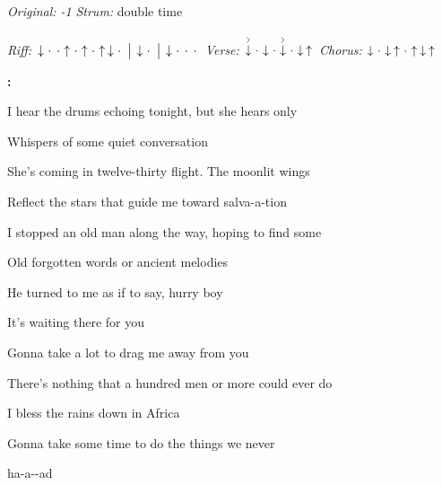 \begin{song}


\begin{headerbox}
 \quad
\textit{Original: -1} \quad
\textit{Strum:} double time \par
\textit{Riff:} $\Down\Miss\Miss\Up\Miss\Up\Miss\Up\Down\Miss \Separator \Down\Miss \Separator \Down\Miss\Miss\Miss$ \quad
\textit{Verse:} $\AccentDown\Miss\Down\Miss\AccentDown\Miss\Down\Up$ \quad
\textit{Chorus:} $\Down\Miss\Down\Up\Miss\Up\Down\Up$
\end{headerbox}

\begin{hchordbox}
\end{hchordbox}

\large

\bigskip

\Intro\textbf{:}     \par

\bigskip

 I hear the drums echoing tonight, but she hears only \par
{}Whispers of some quiet conversation  \par
{} She's coming in twelve-thirty flight. The moonlit wings \par
Reflect the stars that guide me toward salva-a-tion  \par
{} I stopped an old man along the way, hoping to find some \par
{}Old forgotten words or ancient melodies  \par
{} He turned to me as if to say, hurry boy \par
It's waiting there for you  \par

\bigskip

\begin{chorusboxwide}{\Chorus}
 Gonna take a lot to drag me away from you \par
{} There's nothing that a hundred men or more could ever do \par
{} I bless the rains down in Africa \par
{} Gonna take some time to do the things we never \par
{}ha-a--ad \par
{}   \par
{}   \par
\end{chorusboxwide}


\end{song}
